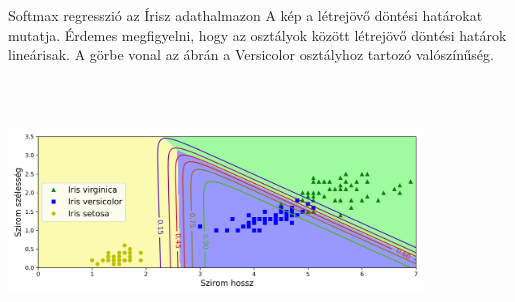 \documentclass[english, aspectratio=169]{beamer}
\begin{document}
\begin{frame}{Softmax regresszió az Írisz adathalmazon}
A kép a létrejövő döntési határokat mutatja. Érdemes megfigyelni, hogy az osztályok között létrejövő döntési határok lineárisak. A görbe vonal az ábrán a Versicolor osztályhoz tartozó valószínűség.
\begin{center}
\includegraphics[width=11cm, height=7cm, keepaspectratio]{images/osztalyozas_22.png}
\end{center}
\end{frame}
\end{document}
